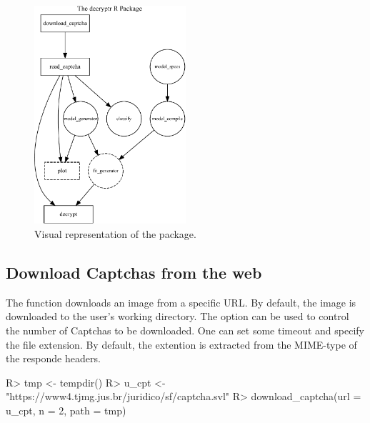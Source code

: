 \documentclass[article,nojss]{jss}
\begin{document}
\begin{CodeChunk}
\begin{figure}

{\centering \includegraphics[width=0.5\textwidth]{decryptr_jss_files/figure-latex/diagram-1} 

}

\caption[Visual representation of the package]{Visual representation of the package.}\label{fig:diagram}
\end{figure}
\end{CodeChunk}

\hypertarget{download-captchas-from-the-web}{%
\subsection{Download Captchas from the
web}\label{download-captchas-from-the-web}}

The  function downloads an image from a specific
URL. By default, the image is downloaded to the user's working
directory. The option  can be used to control the number of
Captchas to be downloaded. One can set some timeout and specify the file
extension. By default, the extention is extracted from the MIME-type of
the responde headers.

\begin{CodeChunk}

\begin{CodeInput}
R> tmp <- tempdir()
R> u_cpt <- "https://www4.tjmg.jus.br/juridico/sf/captcha.svl"
R> download_captcha(url = u_cpt, n = 2, path = tmp)
\end{CodeInput}
\end{CodeChunk}
\end{document}
